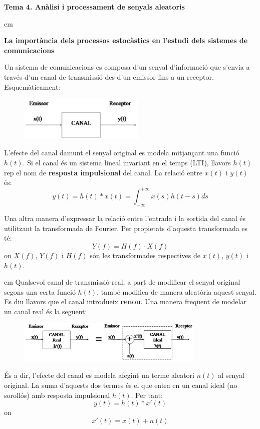 \documentclass{article}
\begin{document}
\textbf{\Large Tema 4. An\`alisi i processament de senyals aleatoris}

 cm

\textbf{\large La import\`ancia dels processos estoc\`astics en l'estudi dels sistemes de comunicacions}

Un sistema de comunicacions es composa d'un senyal d'informaci\'o que s'envia a trav\'es d'un canal de
transmissi\'o des d'un emissor fins a un receptor. Esquem\`aticament:
\begin{figure}[htbp]
\centerline{
\includegraphics[width=6cm]{esqcomunic.eps}
}
\end{figure}

L'efecte del canal damunt el senyal original es modela mitjan\c{c}ant una funci\'o $h(t)$. Si el canal \'es
un sistema lineal invariant en el temps (LTI), llavors $h(t)$ rep el nom de {\bf resposta impulsional} del canal.
La relaci\'o entre $x(t)$ i $y(t)$ \'es:
\[
y(t)=h(t) \ast x(t) = \int_{-\infty}^{+\infty} x(s) h(t-s) ds
\]

Una altra manera d'expressar la relaci\'o entre l'entrada i la sortida del canal \'es utilitzant la transformada 
de Fourier. Per propietats d'aquesta transformada es t\'e:
\[
Y(f)=H(f) \cdot X(f)
\]
\noindent
on $X(f)$, $Y(f)$ i $H(f)$ s\'on les transformades respectives de $x(t)$, $y(t)$ i $h(t)$.

 cm
Qualsevol canal de transmissi\'o real, a part de modificar el senyal original segons una certa funci\'o $h(t)$,
tamb\'e modifica de manera aleat\`oria aquest senyal. Es diu llavors que el canal introdueix {\bf renou}.
Una manera freq\"uent de modelar un canal real \'es la seg\"uent:

\begin{figure}[htbp]
\centerline{
\includegraphics[width=9cm]{esqrenou.eps}
}
\end{figure}

\'Es a dir, l'efecte del canal es modela afegint un terme aleatori $n(t)$ al senyal original. La suma d'aquests
dos termes \'es el que entra en un canal ideal (no soroll\'os) amb resposta impulsional $h(t)$.
Per tant:
$$y(t)=h(t) \ast x'(t)$$ on
$$x'(t)=x(t) + n(t)$$
\end{document}
